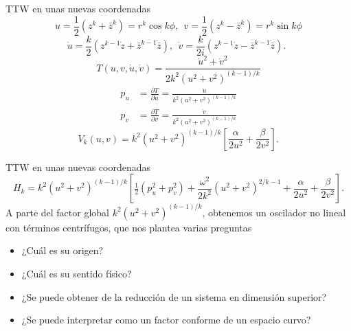 \documentclass[aspectratio=169,mathserif]{beamer}
\begin{document}
  \begin{frame}{TTW en unas nuevas coordenadas}
    \begin{equation*}
	u=\frac{1}{2}(z^k+\bar{z}^k)=r^k\cos k\phi, \ \
	v=\frac{1}{2}(z^k-\bar{z}^k)=r^k\sin k\phi
    \end{equation*}
    \pause
    \begin{equation*}
      \dot{u}=\frac{k}{2}(z^{k-1}\dot{z}+\bar{z}^{k-1}\dot{\bar{z}}), \ \
      \dot{v}=\frac{k}{2i}(z^{k-1}\dot{z}-\bar{z}^{k-1}\dot{\bar{z}}). \ \
    \end{equation*}
    \pause
    \begin{equation*}
      T(u,v,\dot{u},\dot{v})=\frac{\dot{u}^2+\dot{v}^2}{2k^2(u^2+v^2)^{(k-1)/k}}
    \end{equation*}
    \pause
    \begin{align*}
      p_u&=\frac{\partial T}{\partial \dot{u}}=\frac{\dot{u}}{k^2(u^2+v^2)^{(k-1)/k}}\\
      p_v&=\frac{\partial T}{\partial \dot{v}}=\frac{\dot{v}}{k^2(u^2+v^2)^{(k-1)/k}}
    \end{align*}
    \pause
    \begin{equation*}
      V_k(u,v)=k^2(u^2+v^2)^{(k-1)/k}\left[ \frac{\alpha}{2u^2}+\frac{\beta}{2v^2} \right].
    \end{equation*}
  \end{frame}
  \begin{frame}{TTW en unas nuevas coordenadas}
    \begin{equation*}
      H_k=k^2(u^2+v^2)^{(k-1)/k}\left[ \tfrac{1}{2}(p_u^2+p_v^2)+\frac{\omega^2}{2k^2}(u^2+v^2)^{2/k-1}+\frac{\alpha}{2u^2}+\frac{\beta}{2v^2} \right].
    \end{equation*}
    \pause
   A parte del factor global $k^2(u^2+v^2)^{(k-1)/k}$, obtenemos un oscilador no lineal con términos centrífugos, que nos plantea varias preguntas
    \pause
   \begin{itemize}
     \item ¿Cuál es su origen?
    \pause
     \item ¿Cuál es su sentido físico?
    \pause
     \item ¿Se puede obtener de la reducción de un sistema en dimensión superior?
    \pause
     \item ¿Se puede interpretar como un factor conforme de un espacio curvo?
   \end{itemize}
    
  \end{frame}
  
\end{document}
